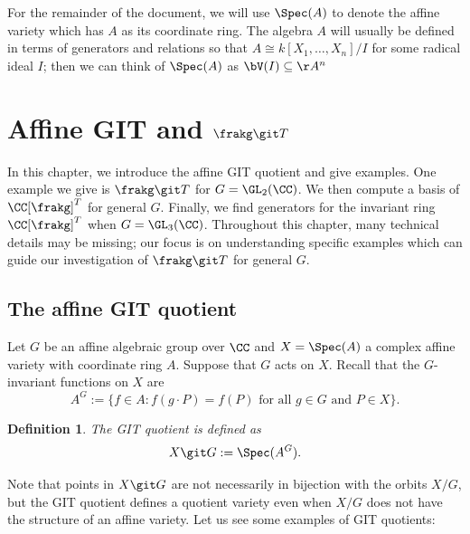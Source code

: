 \documentclass[12pt]{amsart}
\theoremstyle{plain}
\newtheorem{definition}[theorem]{Definition}
\begin{document}
For the remainder of the document, we will use $\Spec(A)$ to denote the affine variety which has $A$ as its coordinate ring.
The algebra $A$ will usually be defined in terms of generators and relations so that $A \cong k[X_1, \ldots, X_n] / I$ for some radical ideal $I$; 
then we can think of $\Spec(A)$ as $\bV(I) \subseteq \AA^n$








\newpage
\section{Affine GIT and $\frakg \git T$}
In this chapter, we introduce the affine GIT quotient and give examples.
One example we give is $\frakg \git T$ for $G = \GL_2(\CC)$.
We then compute a basis of $\CC[\frakg]^T$ for general $G$.
Finally, we find generators for the invariant ring $\CC[\frakg]^T$ when $G = \GL_3(\CC)$.
Throughout this chapter, many technical details may be missing;
our focus is on understanding specific examples which can guide our investigation of $\frakg \git T$ for general $G$.

\subsection{The affine GIT quotient}
Let $G$ be an affine algebraic group over $\CC$ and $X = \Spec(A)$ a complex affine variety with coordinate ring $A$.
Suppose that $G$ acts on $X$.
Recall that the $G$-invariant functions on $X$ are
$$A^G := \{f \in A : f(g \cdot P) = f(P) \text{ for all } g \in G \text{ and } P \in X\}.$$

\begin{definition}
The GIT quotient is defined as
$$X \git G := \Spec(A^G).$$
\end{definition}

Note that points in $X \git G$ are not necessarily in bijection with the orbits $X / G$, but the GIT quotient defines a quotient variety even when $X / G$ does not have the structure of an affine variety.
Let us see some examples of GIT quotients:
\end{document}
